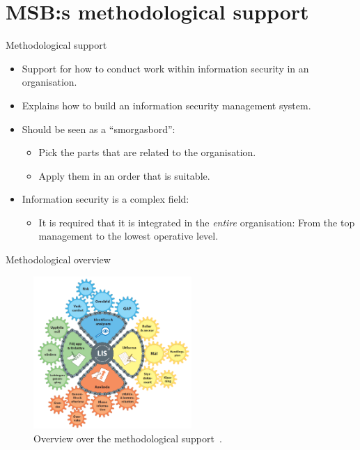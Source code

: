 \documentclass{beamer}
\begin{document}
\section[Methodilogical support]{MSB:s methodological support}

\begin{frame}{Methodological support}
  \begin{itemize}
    \item Support for how to conduct work within information security in an
      organisation.

    \item Explains how to build an information security management system.

    \item Should be seen as a \enquote{smorgasbord}:
      \begin{itemize}
        \item Pick the parts that are related to the organisation.
        \item Apply them in an order that is suitable.
      \end{itemize}

    \item Information security is a complex field:
      \begin{itemize}
        \item It is required that it is integrated in the \emph{entire}
          organisation: From the top management to the lowest operative level.
      \end{itemize}

  \end{itemize}
\end{frame}

\begin{frame}{Methodological overview}
  \begin{figure}
    \includegraphics[width=6cm]{Figures/kugghjulet_lis.png}
    \caption{Overview over the methodological support~\cite{msb_metodstod}.}
  \end{figure}
\end{frame}
\end{document}
